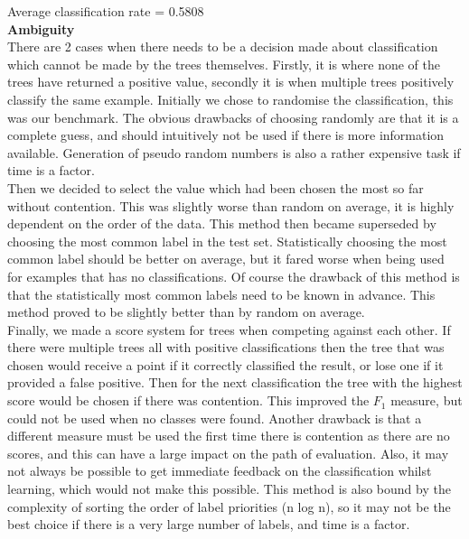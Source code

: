 \documentclass[12pt]{article}
\begin{document}
Average classification rate = 0.5808 \\ 


{\bf Ambiguity} \\
There are 2 cases when there needs to be a decision made about classification which cannot be made by the trees themselves. Firstly, it is where none of the trees have returned a positive value, secondly it is when multiple trees positively classify the same example. Initially we chose to randomise the classification, this was our benchmark. The obvious drawbacks of choosing randomly are that it is a complete guess, and should intuitively not be used if there is more information available. Generation of pseudo random numbers is also a rather expensive task if time is a factor. \\

Then we decided to select the value which had been chosen the most so far without contention. This was slightly worse than random on average, it is highly dependent on the order of the data. This method then became superseded by choosing the most common label in the test set. Statistically choosing the most common label should be better on average, but it fared worse when being used for examples that has no classifications. Of course the drawback of this method is that the statistically most common labels need to be known in advance. This method proved to be slightly better than by random on average. \\

Finally, we made a score system for trees when competing against each other. If there were multiple trees all with positive classifications then the tree that was chosen would receive a point if it correctly classified the result, or lose one if it provided a false positive. Then for the next classification the tree with the highest score would be chosen if there was contention. This improved the \( F_1 \) measure, but could not be used when no classes were found. Another drawback is that a different measure must be used the first time there is contention as there are no scores, and this can have a large impact on the path of evaluation. Also, it may not always be possible to get immediate feedback on the classification whilst learning, which would not make this possible. This method is also bound by the complexity of sorting the order of label priorities (n log n), so it may not be the best choice if there is a very large number of labels, and time is a factor. \\
\end{document}
